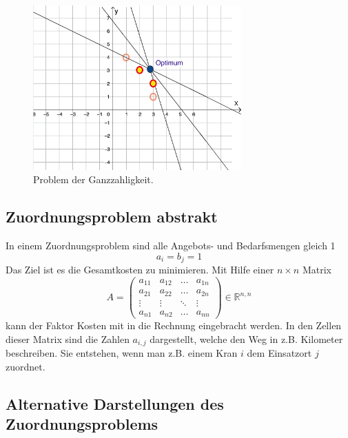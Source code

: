 \begin{figure}
\centering
\includegraphics[width=8cm]{papers/munkres/figures/ganzzahlige_punkte}
\caption{Problem der Ganzzahligkeit.}
\label{munkres:Vr2}
\end{figure}


\subsection{Zuordnungsproblem abstrakt
\label{munkres:subsection:bonorum}}

In einem Zuordnungsproblem sind alle Angebots- und Bedarfsmengen gleich 1 
\begin{equation}
a_{i}=b_{j}=1
\end{equation}
Das Ziel ist es die Gesamtkosten zu minimieren. Mit Hilfe einer $n\times n$ Matrix 
\[
A
=
\begin{pmatrix}
a_{11}&a_{12}&\dots &a_{1n}\\
a_{21}&a_{22}&\dots &a_{2n}\\
\vdots&\vdots&\ddots&\vdots\\
a_{n1}&a_{n2}&\dots &a_{nn}
\end{pmatrix}
\in \mathbb{R}^{n,n}
\]
kann der Faktor Kosten mit in die Rechnung eingebracht werden.
In den Zellen dieser Matrix sind die Zahlen $a_{i,j}$ dargestellt, welche den Weg in z.B. Kilometer beschreiben.
Sie entstehen, wenn man z.B. einem Kran $i$ dem Einsatzort $j$ zuordnet.

\subsection{Alternative Darstellungen des Zuordnungsproblems
\label{munkres:subsection:bonorum}}

